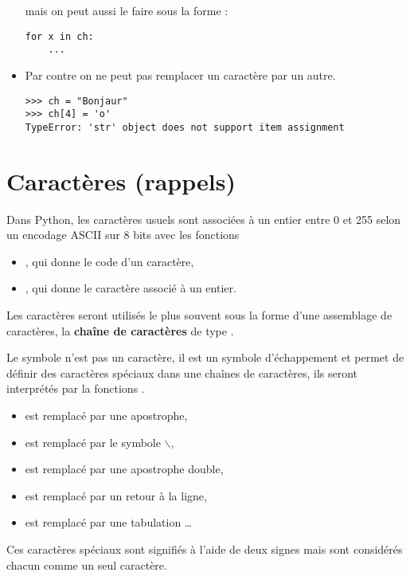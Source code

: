 \begin{itemize}
mais on peut aussi le faire sous la forme :
\begin{lstlisting}
for x in ch:
    ...
\end{lstlisting}
\item Par contre on ne peut pas remplacer un caractère par un autre.
\begin{lstlisting}
>>> ch = "Bonjaur"
>>> ch[4] = 'o'
TypeError: 'str' object does not support item assignment
\end{lstlisting}
\end{itemize}
\section{Caractères (rappels)}
Dans Python, les caractères usuels sont associées à un entier entre 0 et 255 selon un encodage ASCII sur 8 bits avec les fonctions 
\begin{itemize}
\item {}, qui donne le code d'un caractère,
\item {}, qui donne le caractère associé à un entier.
\end{itemize}Les caractères seront utilisés le plus souvent sous la forme d'une assemblage de caractères, la {\bf chaîne de caractères} de type .

Le symbole  n'est pas un caractère, il est un symbole d'échappement et permet de définir des caractères spéciaux dans une chaînes de caractères, ils seront interprétés par la fonctions . 
\begin{itemize}
\item {} est remplacé par une apostrophe,
\item \type{$\backslash\backslash$} est remplacé par le symbole $\backslash$,
\item {} est remplacé par une apostrophe double,
\item {} est remplacé par un retour à la ligne,
\item {} est remplacé par une tabulation \dots
\end{itemize}
Ces caractères spéciaux sont signifiés à l'aide de deux signes mais sont considérés chacun comme un seul caractère.



